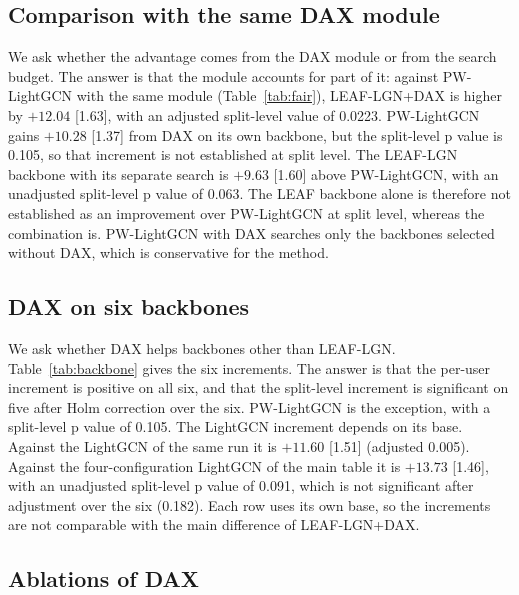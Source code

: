 \subsection{Comparison with the same DAX module}
\label{sec:res-fair}

We ask whether the advantage comes from the DAX module or from the search budget. The answer is that the module accounts for part of it: against PW-LightGCN with the same module (Table~\ref{tab:fair}), LEAF-LGN+DAX is higher by $+12.04$ [1.63], with an adjusted split-level value of 0.0223. PW-LightGCN gains $+10.28$ [1.37]
from DAX on its own backbone, but the split-level p value is 0.105, so that increment is not established at split level. The LEAF-LGN backbone with its
separate search is $+9.63$ [1.60] above PW-LightGCN, with an unadjusted split-level p value of 0.063. The LEAF backbone alone is therefore not established
as an improvement over PW-LightGCN at split level, whereas the combination is. PW-LightGCN with DAX searches only the backbones selected without DAX,
which is conservative for the method.



\subsection{DAX on six backbones}
\label{sec:res-backbone}

We ask whether DAX helps backbones other than LEAF-LGN. Table~\ref{tab:backbone} gives the six increments. The answer is that the per-user increment is positive on all six, and that the split-level
increment is significant on five after Holm correction over the six. PW-LightGCN is the exception, with a split-level p value of 0.105. The LightGCN
increment depends on its base. Against the LightGCN of the same run it is $+11.60$ [1.51] (adjusted 0.005). Against the four-configuration LightGCN of the
main table it is $+13.73$ [1.46], with an unadjusted split-level p value of 0.091, which is not significant after adjustment over the six (0.182). Each
row uses its own base, so the increments are not comparable with the main difference of LEAF-LGN+DAX.



\subsection{Ablations of DAX}
\label{sec:res-ablate}

